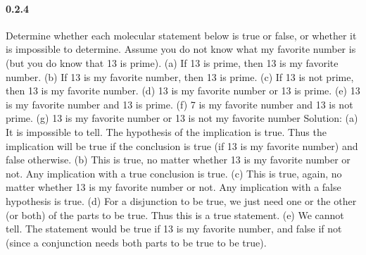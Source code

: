 \documentclass{article}
\begin{document}
\paragraph{0.2.4}
Determine whether each molecular statement below is true or false, or
whether it is impossible to determine. Assume you do not know what
my favorite number is (but you do know that 13 is prime).\newline
(a) If 13 is prime, then 13 is my favorite number.\newline
(b) If 13 is my favorite number, then 13 is prime.\newline
(c) If 13 is not prime, then 13 is my favorite number.\newline
(d) 13 is my favorite number or 13 is prime.\newline
(e) 13 is my favorite number and 13 is prime.\newline
(f) 7 is my favorite number and 13 is not prime.\newline
(g) 13 is my favorite number or 13 is not my favorite number\newline
Solution:\newline
(a) It is impossible to tell. The hypothesis of the implication is true.
Thus the implication will be true if the conclusion is true (if 13 is my
favorite number) and false otherwise.\newline
(b) This is true, no matter whether 13 is my favorite number or not. Any
implication with a true conclusion is true.\newline
(c) This is true, again, no matter whether 13 is my favorite number or
not. Any implication with a false hypothesis is true.\newline
(d) For a disjunction to be true, we just need one or the other (or both)
of the parts to be true. Thus this is a true statement.\newline
(e) We cannot tell. The statement would be true if 13 is my favorite
number, and false if not (since a conjunction needs both parts to be
true to be true).
\end{document}

